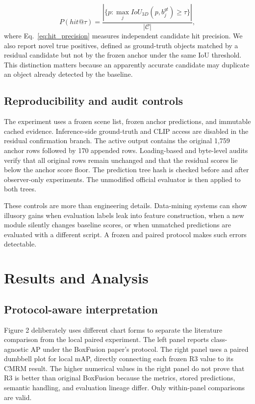 \documentclass[11pt,a4paper]{article}
\begin{document}
\begin{equation}
P(hit@\tau)=\frac{|\{p:\max_j IoU_{3D}(p,b_j^{gt})\ge\tau\}|}{|\mathcal{C}|},
\label{eq:hit_precision}
\end{equation}
where Eq.~\eqref{eq:hit_precision} measures independent candidate hit precision. We also report novel true positives, defined as ground-truth objects matched by a residual candidate but not by the frozen anchor under the same IoU threshold. This distinction matters because an apparently accurate candidate may duplicate an object already detected by the baseline.

\subsection{Reproducibility and audit controls}
The experiment uses a frozen scene list, frozen anchor predictions, and immutable cached evidence. Inference-side ground-truth and CLIP access are disabled in the residual confirmation branch. The active output contains the original 1,759 anchor rows followed by 170 appended rows. Loading-based and byte-level audits verify that all original rows remain unchanged and that the residual scores lie below the anchor score floor. The prediction tree hash is checked before and after observer-only experiments. The unmodified official evaluator is then applied to both trees.

These controls are more than engineering details. Data-mining systems can show illusory gains when evaluation labels leak into feature construction, when a new module silently changes baseline scores, or when unmatched predictions are evaluated with a different script. A frozen and paired protocol makes such errors detectable.

\section{Results and Analysis}
\subsection{Protocol-aware interpretation}
Figure 2 deliberately uses different chart forms to separate the literature comparison from the local paired experiment. The left panel reports class-agnostic AP under the BoxFusion paper's protocol. The right panel uses a paired dumbbell plot for local mAP, directly connecting each frozen R3 value to its CMRM result. The higher numerical values in the right panel do not prove that R3 is better than original BoxFusion because the metrics, stored predictions, semantic handling, and evaluation lineage differ. Only within-panel comparisons are valid.
\end{document}
